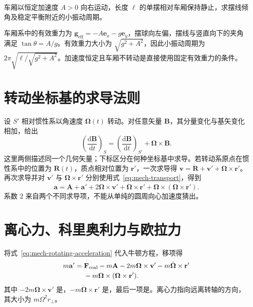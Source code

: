 \documentclass[UTF8,12pt,a4paper,fontset=fandol]{ctexbook}
\begin{document}
\begin{example}[加速车厢中的摆]
车厢以恒定加速度 $A>0$ 向右运动，长度 $\ell$ 的单摆相对车厢保持静止，求摆线倾角及稳定平衡附近的小振动周期。
\end{example}
\begin{solve}
车厢系中的有效重力为 $\mathbf g_{\mathrm{eff}}=-A\mathbf e_x-g\mathbf e_y$，摆球向左偏，摆线与竖直向下的夹角满足 $\tan\theta=A/g$。有效重力大小为 $\sqrt{g^2+A^2}$，因此小振动周期为 $2\pi\sqrt{\ell/\sqrt{g^2+A^2}}$。加速度恒定且车厢不转动是直接使用固定有效重力的条件。
\end{solve}

\section{转动坐标基的求导法则}
设 $S'$ 相对惯性系以角速度 $\boldsymbol\Omega(t)$ 转动。对任意矢量 $\mathbf B$，其分量变化与基矢变化相加，给出
\begin{equation}
 \left(\frac{\mathrm d\mathbf B}{\mathrm dt}\right)_S
 =\left(\frac{\mathrm d\mathbf B}{\mathrm dt}\right)_{S'}+\boldsymbol\Omega\times\mathbf B.
 \label{eq:mech-transport}
\end{equation}
这里两侧描述同一个几何矢量；下标区分在何种坐标基中求导。若转动系原点在惯性系中的位置为 $\mathbf R(t)$，质点相对位置为 $\mathbf r'$，一次求导得 $\mathbf v=\dot{\mathbf R}+\mathbf v'+\boldsymbol\Omega\times\mathbf r'$。再次求导并对 $\mathbf v'$ 与 $\boldsymbol\Omega\times\mathbf r'$ 分别使用式~\eqref{eq:mech-transport}，得到
\begin{equation}
 \mathbf a=\mathbf A+\mathbf a'+2\boldsymbol\Omega\times\mathbf v'
 +\dot{\boldsymbol\Omega}\times\mathbf r'
 +\boldsymbol\Omega\times(\boldsymbol\Omega\times\mathbf r').
 \label{eq:mech-rotating-acceleration}
\end{equation}
系数 $2$ 来自两个不同求导项，不能从单纯的圆周向心加速度猜出。

\section{离心力、科里奥利力与欧拉力}
将式~\eqref{eq:mech-rotating-acceleration} 代入牛顿方程，移项得
\begin{align}
 m\mathbf a'={}&\mathbf F_{\mathrm{real}}-m\mathbf A
 -2m\boldsymbol\Omega\times\mathbf v'
 -m\dot{\boldsymbol\Omega}\times\mathbf r'\notag\\
 &-m\boldsymbol\Omega\times(\boldsymbol\Omega\times\mathbf r').
 \label{eq:mech-rotating-newton}
\end{align}
其中 $-2m\boldsymbol\Omega\times\mathbf v'$ 是，$-m\dot{\boldsymbol\Omega}\times\mathbf r'$ 是，最后一项是。离心力指向远离转轴的方向，其大小为 $m\Omega^2r_\perp$。
\end{document}
